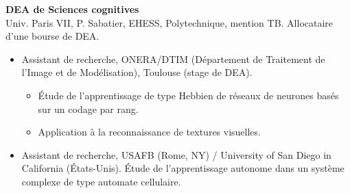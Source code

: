 \vspace*{.3cm} 
	\textbf{DEA de Sciences cognitives} \hfill {} \\ Univ. Paris VII, P. Sabatier, EHESS, Polytechnique, mention TB. Allocataire d'une bourse de DEA. 
	\begin{itemize}	
			\item  Assistant de recherche, ONERA/DTIM (Département de Traitement de l'Image et de Modélisation), Toulouse (stage de DEA).  
			\begin{itemize}
				\item  \'Etude de l'apprentissage de type Hebbien de réseaux de neurones basés sur un codage par rang. 
				\item  Application à  la reconnaissance de textures visuelles.
			\end{itemize} %
			\item Assistant de recherche, USAFB (Rome, NY)  / University of San Diego in California (\'Etats-Unis). %
			\'Etude de l'apprentissage autonome dans un système complexe de type automate cellulaire. %
	\end{itemize} %
	 
